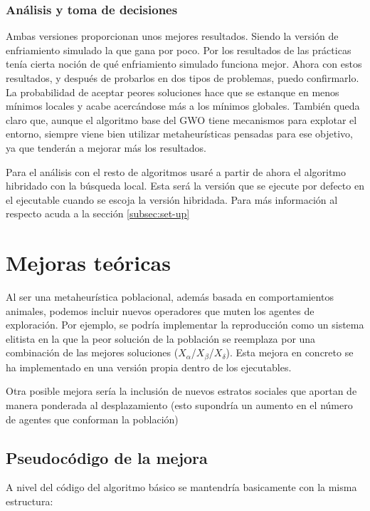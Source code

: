 \documentclass[a4paper, 12.5pt]{report}
\begin{document}
\subsubsection*{Análisis y toma de decisiones}
Ambas versiones proporcionan unos mejores resultados. Siendo la versión de enfriamiento simulado la que gana por poco. Por los resultados de las prácticas tenía cierta noción de qué enfriamiento simulado funciona mejor. Ahora con estos resultados, y después de probarlos en dos tipos de problemas, puedo confirmarlo. La probabilidad de aceptar peores soluciones hace que se estanque en menos mínimos locales y acabe acercándose más a los mínimos globales. También queda claro que, aunque el algoritmo base del GWO tiene mecanismos para explotar el entorno, siempre viene bien utilizar metaheurísticas pensadas para ese objetivo, ya que tenderán a mejorar más los resultados.

Para el análisis con el resto de algoritmos usaré a partir de ahora el algoritmo hibridado con la búsqueda local. Esta será la versión que se ejecute por defecto en el ejecutable cuando se escoja la versión hibridada. Para más información al respecto acuda a la sección \ref{subsec:set-up}



\section{Mejoras teóricas}
Al ser una metaheurística poblacional, además basada en comportamientos animales, podemos incluir nuevos operadores que muten los agentes de exploración. Por ejemplo, se podría implementar la reproducción como un sistema elitista en la que la peor solución de la población se reemplaza por una combinación de las mejores soluciones ($X_\alpha$/$X_\beta$/$X_\delta$). Esta mejora en concreto se ha implementado en una versión propia dentro de los ejecutables.


Otra posible mejora sería la inclusión de nuevos estratos sociales que aportan de manera ponderada al desplazamiento (esto supondría un aumento en el número de agentes que conforman la población)

\subsection{Pseudocódigo de la mejora}

A nivel del código del algoritmo básico se mantendría basicamente con la misma estructura:
\end{document}
